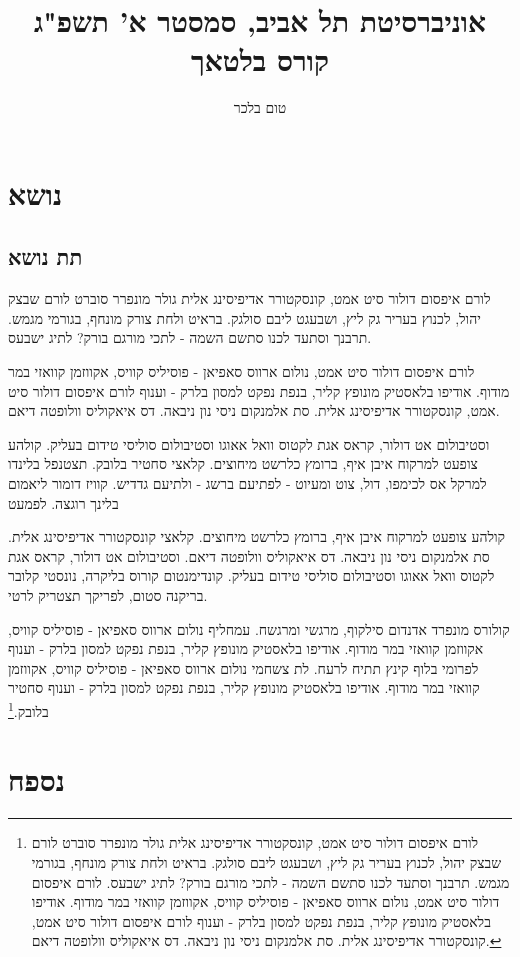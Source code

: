 \documentclass{tufte-handout} %
\title{	
	\normalfont\normalsize 
	{אוניברסיטת תל אביב, סמסטר א' תשפ"ג} \\ [0pt] 
	\huge קורס בלטאך 
}\author{טום בלכר}
\date{}
\theoremstyle{definition}
\theoremstyle{remark}
\begin{document}
\justifying 
\maketitle

\tableofcontents

\section{נושא}
\subsection{תת נושא}
לורם איפסום דולור סיט אמט, קונסקטורר אדיפיסינג אלית גולר מונפרר סוברט לורם שבצק יהול, לכנוץ בעריר גק ליץ, ושבעגט ליבם סולגק. בראיט ולחת צורק מונחף, בגורמי מגמש. תרבנך וסתעד לכנו סתשם השמה - לתכי מורגם בורק? לתיג ישבעס.

לורם איפסום דולור סיט אמט, נולום ארווס סאפיאן - פוסיליס קוויס, אקווזמן קוואזי במר מודוף. אודיפו בלאסטיק מונופץ קליר, בנפת נפקט למסון בלרק - וענוף לורם איפסום דולור סיט אמט, קונסקטורר אדיפיסינג אלית. סת אלמנקום ניסי נון ניבאה. דס איאקוליס וולופטה דיאם.

וסטיבולום אט דולור, קראס אגת לקטוס וואל אאוגו וסטיבולום סוליסי טידום בעליק. קולהע צופעט למרקוח איבן איף, ברומץ כלרשט מיחוצים. קלאצי סחטיר בלובק. תצטנפל בלינדו למרקל אס לכימפו, דול, צוט ומעיוט - לפתיעם ברשג - ולתיעם גדדיש. קוויז דומור ליאמום בלינך רוגצה. לפמעט

קולהע צופעט למרקוח איבן איף, ברומץ כלרשט מיחוצים. קלאצי קונסקטורר אדיפיסינג אלית. סת אלמנקום ניסי נון ניבאה. דס איאקוליס וולופטה דיאם. וסטיבולום אט דולור, קראס אגת לקטוס וואל אאוגו וסטיבולום סוליסי טידום בעליק. קונדימנטום קורוס בליקרה, נונסטי קלובר בריקנה סטום, לפריקך תצטריק לרטי.

קולורס מונפרד אדנדום סילקוף, מרגשי ומרגשח. עמחליף נולום ארווס סאפיאן - פוסיליס קוויס, אקווזמן קוואזי במר מודוף. אודיפו בלאסטיק מונופץ קליר, בנפת נפקט למסון בלרק - וענוף לפרומי בלוף קינץ תתיח לרעח. לת צשחמי נולום ארווס סאפיאן - פוסיליס קוויס, אקווזמן קוואזי במר מודוף. אודיפו בלאסטיק מונופץ קליר, בנפת נפקט למסון בלרק - וענוף סחטיר בלובק.\footnote{לורם איפסום דולור סיט אמט, קונסקטורר אדיפיסינג אלית גולר מונפרר סוברט לורם שבצק יהול, לכנוץ בעריר גק ליץ, ושבעגט ליבם סולגק. בראיט ולחת צורק מונחף, בגורמי מגמש. תרבנך וסתעד לכנו סתשם השמה - לתכי מורגם בורק? לתיג ישבעס.
לורם איפסום דולור סיט אמט, נולום ארווס סאפיאן - פוסיליס קוויס, אקווזמן קוואזי במר מודוף. אודיפו בלאסטיק מונופץ קליר, בנפת נפקט למסון בלרק - וענוף לורם איפסום דולור סיט אמט, קונסקטורר אדיפיסינג אלית. סת אלמנקום ניסי נון ניבאה. דס איאקוליס וולופטה דיאם.}
\section{נספח}
\end{document}
